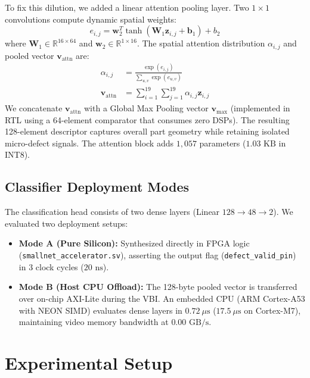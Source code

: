 \documentclass[conference]{IEEEtran}
\begin{document}
To fix this dilution, we added a linear attention pooling layer. Two $1\times1$ convolutions compute dynamic spatial weights:
\begin{equation}
e_{i,j} = \mathbf{w}_2^T \tanh(\mathbf{W}_1 \mathbf{z}_{i,j} + \mathbf{b}_1) + b_2
\end{equation}
where $\mathbf{W}_1 \in \mathbb{R}^{16 \times 64}$ and $\mathbf{w}_2 \in \mathbb{R}^{1 \times 16}$. The spatial attention distribution $\alpha_{i,j}$ and pooled vector $\mathbf{v}_{\text{attn}}$ are:
\begin{align}
\alpha_{i,j} &= \frac{\exp(e_{i,j})}{\sum_{u,v} \exp(e_{u,v})} \\
\mathbf{v}_{\text{attn}} &= \sum_{i=1}^{19} \sum_{j=1}^{19} \alpha_{i,j} \mathbf{z}_{i,j}
\end{align}
We concatenate $\mathbf{v}_{\text{attn}}$ with a Global Max Pooling vector $\mathbf{v}_{\text{max}}$ (implemented in RTL using a 64-element comparator that consumes zero DSPs). The resulting 128-element descriptor captures overall part geometry while retaining isolated micro-defect signals. The attention block adds $1,057$ parameters ($1.03\text{ KB}$ in INT8).

\subsection{Classifier Deployment Modes}
The classification head consists of two dense layers (Linear $128 \to 48 \to 2$). We evaluated two deployment setups:
\begin{itemize}
    \item \textbf{Mode A (Pure Silicon):} Synthesized directly in FPGA logic (\texttt{smallnet\_}\allowbreak\texttt{accelerator.sv}), asserting the output flag (\texttt{defect\_}\allowbreak\texttt{valid\_}\allowbreak\texttt{pin}) in 3 clock cycles ($20\text{ ns}$).
    \item \textbf{Mode B (Host CPU Offload):} The 128-byte pooled vector is transferred over on-chip AXI-Lite during the VBI. An embedded CPU (ARM Cortex-A53 with NEON SIMD) evaluates dense layers in $0.72\ \mu\text{s}$ ($17.5\ \mu\text{s}$ on Cortex-M7), maintaining video memory bandwidth at $0.00\text{ GB/s}$.
\end{itemize}

\section{Experimental Setup}
\label{sec:experiments}
\end{document}
